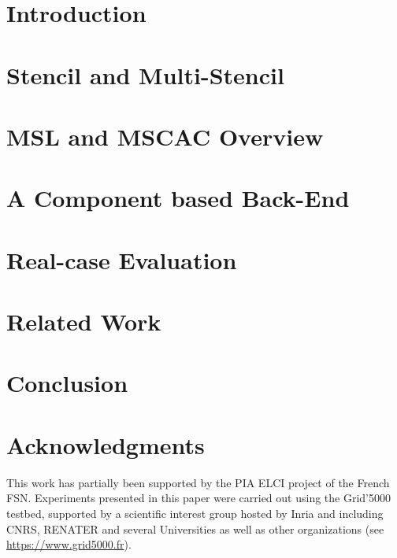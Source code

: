 \documentclass{acm_proc_article-sp}
\begin{document}

\section{Introduction}
\label{sect:intro}

\section{Stencil and Multi-Stencil}
\label{sect:concept}

\section{MSL and MSCAC Overview }
\label{sect:mscac}


\section{A Component based Back-End}
\label{sect:component}

\section{Real-case Evaluation}
\label{sect:eval}

\section{Related Work}
\label{sect:related}

\section{Conclusion}
\label{sect:conclusion}


\section{Acknowledgments}

This work has partially been supported by the PIA ELCI project of the French FSN.
Experiments presented in this paper were carried out using the
Grid'5000 testbed, supported by a scientific interest group hosted by
Inria and
including CNRS, RENATER and several Universities as well as
other
organizations (see \url{https://www.grid5000.fr}).



\end{document}
